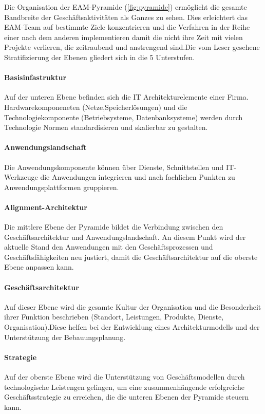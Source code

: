 \documentclass[
	A4paper,
	DIV=9,
	BCOR7mm,
	smallheadings,
	headinclude,
	footinclude,
	headsepline,
	parindent,
	german,
	captions=tableheading,
	abstracton
	]{scrreprt}
\begin{document}
Die Organisation der EAM-Pyramide (\autoref{fig:pyramide}) ermöglicht die gesamte Bandbreite der Geschäftsaktivitäten als Ganzes zu sehen. Dies erleichtert das EAM-Team auf bestimmte Ziele konzentrieren und die Verfahren in der  Reihe einer nach dem anderen implementieren damit die nicht ihre Zeit mit vielen  Projekte verlieren, die zeitraubend und anstrengend sind.Die vom Leser gesehene Stratifizierung der Ebenen gliedert sich in die 5 Unterstufen.

\paragraph{Basisinfastruktur} Auf der unteren Ebene befinden sich die IT Architekturelemente einer Firma. Hardwarekomponeneten (Netze,Speicherlösungen) und die Technologiekomponente (Betriebsysteme, Datenbanksysteme) werden durch Technologie Normen standardisieren und skalierbar zu gestalten.

\paragraph{Anwendungslandschaft} Die Anwendungskomponente können über Dienste, Schnittstellen und IT-Werkzeuge die Anwendungen integrieren und nach fachlichen Punkten zu Anwendungsplattformen gruppieren.

\paragraph{Alignment-Architektur} Die mittlere Ebene der Pyramide bildet die Verbindung zwischen den Geschäftsarchitektur und Anwendungslandschaft. An diesem Punkt wird der aktuelle Stand den Anwendungen mit den Geschäftsprozessen und Geschäftsfähigkeiten  neu justiert, damit die Geschäftsarchitektur auf die oberste Ebene anpassen kann.

\paragraph{Geschäftsarchitektur} Auf dieser Ebene wird die gesamte Kultur der Organisation und die Besonderheit ihrer Funktion beschrieben (Standort, Leistungen, Produkte, Dienste, Organisation).Diese helfen bei der Entwicklung eines Architekturmodells und der Unterstützung der Bebauungsplanung.

\paragraph{Strategie} Auf der oberste Ebene wird die Unterstützung von Geschäftsmodellen durch technologische Leistengen gelingen, um eine zusammenhängende erfolgreiche Geschäftsstrategie zu erreichen, die die unteren Ebenen der Pyramide steuern kann.
\mbox{}\\
\end{document}
